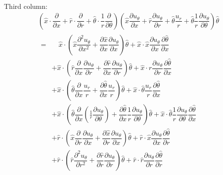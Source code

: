 \documentclass{kthreport}
\begin{document}
Third column:
\begin{eqnarray}
		\left(\hat{x}\cdot\dfrac{\partial}{\partial x} + \hat{r}\cdot\dfrac{\partial}{\partial r} + \hat{\theta}\cdot\dfrac{1}{r}\dfrac{\partial}{\partial \theta}\right)
\left(	\hat{x}\dfrac{\partial u_{\theta}}{\partial x}  + \hat{r}\dfrac{\partial u_{\theta}}{\partial r} + \hat{\theta} \dfrac{u_{r}}{r} + \hat{\theta}\dfrac{1}{r}\dfrac{\partial u_{\theta}}{\partial \theta}
\right) \hat{\theta} \nonumber \\
%
\begin{split}
	= & \quad \hat{x}\cdot\left(\hat{x}\dfrac{\partial^{2}u_{\theta}}{\partial x^{2}} + \dfrac{\partial \hat{x}}{\partial x}\dfrac{\partial u_{\theta}}{\partial x} \right)\hat{\theta} + \hat{x}\cdot\hat{x}\dfrac{\partial u_{\theta}}{\partial x}\dfrac{\partial \hat{\theta}}{\partial x} \\
	&+ \hat{x}\cdot\left(\hat{r}\dfrac{\partial }{\partial x}\dfrac{\partial u_{\theta}}{\partial r} + \dfrac{\partial \hat{r}}{\partial x}\dfrac{\partial u_{\theta}}{\partial r}\right)\hat{\theta} + \hat{x}\cdot\hat{r}\dfrac{\partial u_{\theta}}{\partial r}\dfrac{\partial \hat{\theta}}{\partial x} \\
	& + \hat{x}\cdot\left( \hat{\theta}\dfrac{\partial }{\partial x}\dfrac{u_{r}}{r}	+ \dfrac{\partial \hat{\theta}}{\partial x}\dfrac{u_{r}}{r}  \right)\hat{\theta}   + \hat{x}\cdot\hat{\theta}\dfrac{u_{r}}{r}\dfrac{\partial \hat{\theta}}{\partial x} \\
	&+ \hat{x}\cdot\left(\hat{\theta}\dfrac{\partial }{\partial x}\left(\frac{1}{r}\dfrac{\partial u_{\theta}}{\partial \theta}\right) + \dfrac{\partial \hat{\theta}}{\partial x}\dfrac{1}{r}\dfrac{\partial u_{\theta}}{\partial \theta} \right)\hat{\theta} + \hat{x}\cdot\hat{\theta}\dfrac{1}{r}\dfrac{\partial u_{\theta}}{\partial \theta}\dfrac{\partial \hat{\theta}}{\partial x}\\
	&+ \hat{r}\cdot\left(\hat{x}\dfrac{\partial }{\partial r}\dfrac{\partial u_{\theta}}{\partial x} + \dfrac{\partial \hat{x}}{\partial r}\dfrac{\partial u_{\theta}}{\partial x}	\right)\hat{\theta} + \hat{r}\cdot\hat{x}\dfrac{\partial u_{\theta}}{\partial x}\dfrac{\partial \hat{\theta}}{\partial r} \\
	&+ \hat{r}\cdot\left(\hat{r}\dfrac{\partial^{2}u_{\theta}}{\partial r^{2}} + \dfrac{\partial \hat{r}}{\partial r}\dfrac{\partial u_{\theta}}{\partial r}\right)\hat{\theta} + \hat{r}\cdot\hat{r}\dfrac{\partial u_{\theta}}{\partial r}\dfrac{\partial \hat{\theta}}{\partial r}\\

\end{split}
\end{eqnarray}
\end{document}
